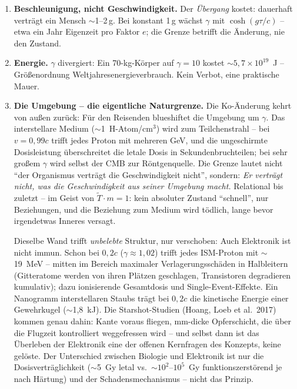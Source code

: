 \begin{enumerate}
  \item \textbf{Beschleunigung, nicht Geschwindigkeit.} Der
        \emph{Übergang} kostet: dauerhaft verträgt ein Mensch
        $\sim$1--2\,g. Bei konstant 1\,g wächst $\gamma$ mit
        $\cosh(g\tau/c)$ -- etwa ein Jahr Eigenzeit pro Faktor $e$;
        die Grenze betrifft die Änderung, nie den Zustand.
  \item \textbf{Energie.} $\gamma$ divergiert: Ein 70-kg-Körper
        auf $\gamma = 10$ kostet $\sim 5{,}7\times10^{19}$~J --
        Größenordnung Weltjahresenergieverbrauch. Kein Verbot, eine
        praktische Mauer.
  \item \textbf{Die Umgebung -- die eigentliche Naturgrenze.} Die
        Ko-Änderung kehrt von außen zurück: Für den Reisenden
        blueshiftet die Umgebung um $\gamma$. Das interstellare
        Medium ($\sim$1~H-Atom/cm$^3$) wird zum Teilchenstrahl --
        bei $v = 0{,}99c$ trifft jedes Proton mit mehreren GeV, und
        die ungeschirmte Dosisleistung überschreitet die letale
        Dosis in Sekundenbruchteilen; bei sehr großem $\gamma$ wird
        selbst der CMB zur Röntgenquelle. Die Grenze lautet nicht
        \enquote{der Organismus verträgt die Geschwindigkeit
        nicht}, sondern: \emph{Er verträgt nicht, was die
        Geschwindigkeit aus seiner Umgebung macht.} Relational bis
        zuletzt -- im Geist von $\tilde T \cdot m = 1$: kein
        absoluter Zustand \enquote{schnell}, nur Beziehungen, und
        die Beziehung zum Medium wird tödlich, lange bevor
        irgendetwas Inneres versagt.

        Dieselbe Wand trifft \emph{unbelebte} Struktur, nur
        verschoben: Auch Elektronik ist nicht immun. Schon bei
        $0{,}2c$ ($\gamma \approx 1{,}02$) trifft jedes ISM-Proton
        mit $\sim$19~MeV -- mitten im Bereich maximaler
        Verlagerungsschäden in Halbleitern (Gitteratome werden von
        ihren Plätzen geschlagen, Transistoren degradieren
        kumulativ); dazu ionisierende Gesamtdosis und
        Single-Event-Effekte. Ein Nanogramm interstellaren Staubs
        trägt bei $0{,}2c$ die kinetische Energie einer
        Gewehrkugel ($\sim$1{,}8~kJ). Die Starshot-Studien (Hoang,
        Loeb et al.\ 2017) kommen genau dahin: Kante voraus
        fliegen, mm-dicke Opferschicht, die über die Flugzeit
        kontrolliert weggefressen wird -- und selbst dann ist das
        Überleben der Elektronik eine der offenen Kernfragen des
        Konzepts, keine gelöste. Der Unterschied zwischen Biologie
        und Elektronik ist nur die Dosisverträglichkeit
        ($\sim$5~Gy letal vs.\ $\sim$$10^2$--$10^5$~Gy
        funktionszerstörend je nach Härtung) und der
        Schadensmechanismus -- nicht das Prinzip.
\end{enumerate}

